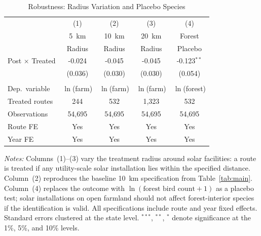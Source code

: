 \begin{table}[t]
\centering
\begin{threeparttable}
\caption{Robustness: Radius Variation and Placebo Species}
\label{tab:robust}
\begin{tabular}{lcccc}
\toprule
 & (1) & (2) & (3) & (4) \\
 & 5~km & 10~km & 20~km & Forest \\
 & Radius & Radius & Radius & Placebo \\
\midrule
Post $\times$ Treated & -0.024 & -0.045 & -0.045 & -0.123$^{**}$ \\
 & (0.036) & (0.030) & (0.030) & (0.054) \\
\\[4pt]
Dep.\ variable & $\ln$(farm) & $\ln$(farm) & $\ln$(farm) & $\ln$(forest) \\
Treated routes & 244 & 532 & 1,323 & 532 \\
Observations & 54,695 & 54,695 & 54,695 & 54,695 \\
Route FE & Yes & Yes & Yes & Yes \\
Year FE & Yes & Yes & Yes & Yes \\
\bottomrule
\end{tabular}
\begin{tablenotes}[flushleft]\small
\item \textit{Notes:} Columns~(1)--(3) vary the treatment radius around solar facilities: a route is treated if any utility-scale solar installation lies within the specified distance. Column~(2) reproduces the baseline 10~km specification from Table~\ref{tab:main}. Column~(4) replaces the outcome with $\ln(\text{forest bird count} + 1)$ as a placebo test; solar installations on open farmland should not affect forest-interior species if the identification is valid. All specifications include route and year fixed effects. Standard errors clustered at the state level. $^{***}$, $^{**}$, $^{*}$ denote significance at the 1\%, 5\%, and 10\% levels.
\end{tablenotes}
\end{threeparttable}
\end{table}

